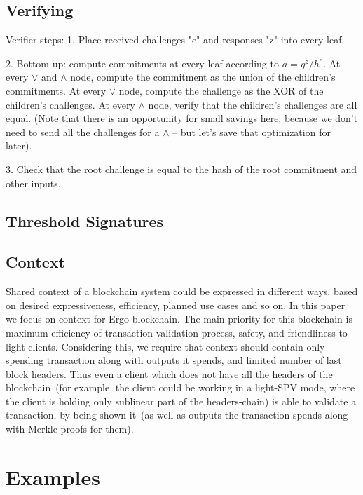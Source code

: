 \documentclass[]{llncs}
\newcommand{\authnote}[2]{\marginpar{\parbox{\marginparwidth}{\tiny %
  \textsf{#1 {\textcolor{blue}{notes: #2}}}}}%
  \textcolor{blue}{\textbf{\dag}}}
\newcommand{\authnote}[2]{
  \textsf{#1 \textcolor{blue}{: #2}}}
\newcommand{\authnote}[2]{}
\newcommand{\knote}[1]{{\authnote{\textcolor{green}{kushti notes}}{#1}}}
\begin{document}
\subsection{Verifying}
\label{sec:verifying}

Verifier steps:
    1. Place received challenges "e" and responses "z" into every leaf.

    2. Bottom-up: compute commitments at every leaf according to $a = g^z/h^e$. At every $\lor$ and $\land$ node, compute
      the commitment as the union of the children's commitments. At every $\lor$ node, compute the challenge as the XOR of
      the children's challenges. At every $\land$ node, verify that the children's challenges are all equal. (Note that
      there is an opportunity for small savings here, because we don't need to send all the challenges for a $\land$ --
      but let's save that optimization for later).

    3. Check that the root challenge is equal to the hash of the root commitment and other inputs.

\subsection{Threshold Signatures}

\subsection{Context}

Shared context of a blockchain system could be expressed in different ways, based on desired expressiveness, efficiency, planned use cases and so on. In this paper we focus on context for Ergo blockchain. The main priority for this blockchain is maximum efficiency of transaction validation process, safety, and friendliness to light clients. Considering this, we require that context should contain only spending transaction along with outputs it spends, and limited number of last block headers. Thus even a client which does not have all the headers of the blockchain~(for example, the client could be working in a light-SPV mode, where the client is holding only sublinear part of the headers-chain) is able to validate a transaction, by being shown it~(as well as outputs the transaction spends along with Merkle proofs for them).

\knote{brief context description, link to an appendix with details}


\section{Examples}
\end{document}
